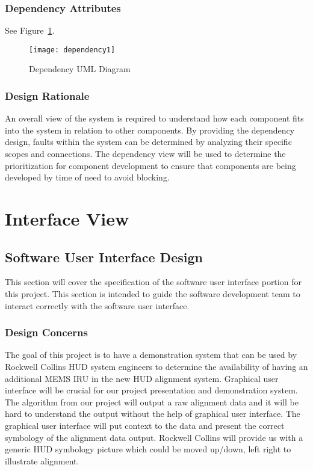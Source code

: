 		\subsubsection{Dependency Attributes}
		See Figure~\ref{fig:dependency1}.\\

		\begin{figure}
			\centering
		 		\caption{Dependency UML Diagram}			%
		      	\texttt{[image: dependency1]}
		    \label{fig:dependency1}
		\end{figure}

		\subsubsection{Design Rationale}
		An overall view of the system is required to understand how each component fits into the system in relation to other components. By providing the dependency design, faults within the system can be determined by analyzing their specific scopes and connections. The dependency view will be used to determine the prioritization for component development to ensure that components are being developed by time of need to avoid blocking.


\section{Interface View}
	\subsection{Software User Interface Design}
	This section will cover the specification of the software user interface portion for this project. This section is intended to guide the software development team to interact correctly with the software user interface.\\

		\subsubsection{Design Concerns}
		The goal of this project is to have a demonstration system that can be used by Rockwell Collins HUD system engineers to determine the availability of having an additional MEMS IRU in the new HUD alignment system. Graphical user interface will be crucial for our project presentation and demonstration system. The algorithm from our project will output a raw alignment data and it will be hard to understand the output without the help of graphical user interface. The graphical user interface will put context to the data and present the correct symbology of the alignment data output. Rockwell Collins will provide us with a generic HUD symbology picture which could be moved up/down, left right to illustrate alignment.\\

